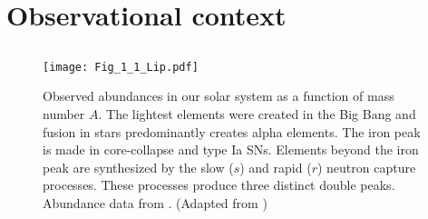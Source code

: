 
\section{Observational context}


\subsection{\rproc{} \nuc{}}\label{sec:intro:nucleo}

%

\begin{figure}[t]
    \centering
    \texttt{[image: Fig\_1\_1\_Lip.pdf]}
    \caption{Observed abundances in our solar system as a function of mass number
        $A$. The lightest elements were created in the Big Bang and fusion in stars predominantly
        creates alpha elements. The iron peak is made in core-collapse and type
        Ia \acp{SN}. Elements beyond the iron peak are synthesized by the slow ($s$) and
        rapid ($r$) neutron capture processes. These processes produce three distinct double
        peaks. Abundance data from \citet{Lodders:2003}. (Adapted from \citet{Lippuner:2018phd})
    }
    \label{fig:nuc:fig11_lip}
\end{figure}

